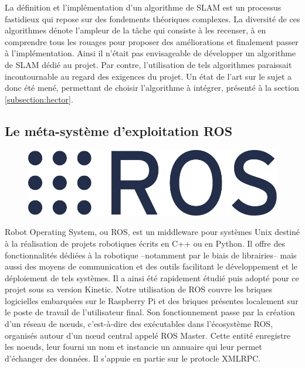 La définition et l'implémentation d'un algorithme de SLAM est un processus fastidieux qui repose sur des fondements théoriques complexes. 
La diversité de ces algorithmes\cite{Bib_openslam} dénote l'ampleur de la tâche qui consiste à les recenser, à en comprendre tous les rouages pour proposer des améliorations et finalement passer à l'implémentation. 
Ainsi il n'était pas envisageable de développer un algorithme de SLAM dédié au projet. 
Par contre, l'utilisation de tels algorithmes paraissait incontournable au regard des exigences du projet. 
Un état de l'art sur le sujet a donc été mené, permettant de choisir l'algorithme à intégrer, présenté à la section \ref{subsection:hector}. 

  \subsection{Le méta-système d'exploitation ROS}

\begin{figure}[h]
  \centering
    \includegraphics[width=.2\linewidth]{figures/ros_logo}  
  \label{fig:ros}
\end{figure} 
  
Robot Operating System, ou \gls{ROS}, est un middleware pour systèmes Unix destiné à la réalisation de projets robotiques écrits en C++ ou en Python.
Il offre des fonctionnalités dédiées à la robotique --notamment par le biais de librairies-- mais aussi des moyens de communication et des outils facilitant le développement et le déploiement de tels systèmes. 
Il a ainsi été rapidement étudié puis adopté pour ce projet sous sa version Kinetic. 
Notre utilisation de \gls{ROS} couvre les briques logicielles embarquées sur le Raspberry Pi et des briques présentes localement sur le poste de travail de l'utilisateur final. 
Son fonctionnement passe par la création d'un réseau de n\oe{}uds\cite{Bib_ROS_nodes}, c'est-à-dire des exécutables dans l'écosystème \gls{ROS}, organisés autour d'un n\oe{}ud central appelé \gls{ROS} Master\cite{Bib_ROS_master}.
Cette entité enregistre les noeuds, leur fourni un nom et instancie un annuaire qui leur permet d'échanger des données. 
Il s'appuie en partie sur le protocle \gls{XMLRPC}.

